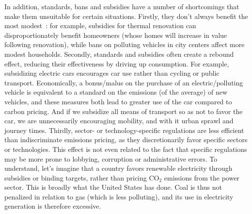 \documentclass[a5paper,french,openany]{memoir}
\begin{document}
{{In addition, standards, bans and subsidies have a number of shortcomings that make them unsuitable for certain situations. Firstly, they don't always benefit the most modest~: for example, subsidies for thermal renovation can disproportionately benefit homeowners (whose homes will increase in value following renovation), while bans on polluting vehicles in city centers affect more modest households. Secondly, standards and subsidies often create a rebound effect, reducing their effectiveness by driving up consumption. For example, subsidizing electric cars encourages car use rather than cycling or public transport. 
Economically, a bonus/malus on the purchase of an electric/polluting vehicle is equivalent to a standard on the emissions (of the average) of new vehicles, and these measures both lead to greater use of the car compared to carbon pricing. And if we subsidize all means of transport so as not to favor the car, we are unnecessarily encouraging mobility, and with it urban sprawl and journey times. %
Thirdly, sector- or technology-specific regulations are less efficient than indiscriminate emissions pricing, as they discretionarily favor specific sectors or technologies. This effect is not even related to the fact that specific regulations may be more prone to lobbying, corruption or administrative errors. 
To understand, let's imagine that a country favors renewable electricity through subsidies or binding targets, rather than pricing CO$_\text{2}$ emissions from the power sector. This is broadly what the United States has done. Coal is thus not penalized in relation to gas (which is less polluting), and its use in electricity generation is therefore excessive. %

}}
\end{document}
